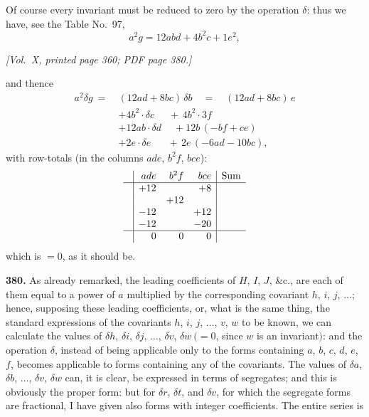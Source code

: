 \documentclass[11pt]{article}
\begin{document}
\medskip

Of course every invariant must be reduced to zero by the operation $\delta$: thus we have, see the Table No.~97,
\[
a^{2}g = 12abd + 4b^{2}c + 1e^{2},
\]

\newpage

\noindent\textit{[Vol.~X, printed page 360; PDF page 380.]}

\medskip

and thence
\begin{align*}
a^{2}\delta g\ =\ &(12ad+8bc)\,\delta b \quad =\quad (12ad+8bc)\,e \\
&+4b^{2}\cdot \delta c \quad\ \ +\,4b^{2}\cdot 3f \\
&+12ab\cdot \delta d \quad\ +12b\,(-bf+ce) \\
&+2e\cdot \delta e \quad\ \ \ +\,2e\,(-6ad-10bc),
\end{align*}
with row-totals (in the columns $ade$, $b^{2}f$, $bce$):
\[
\begin{array}{l|rrr|r}
 & ade & b^{2}f & bce & \text{Sum} \\\hline
 & +12 & & +8 & \\
 & & +12 & & \\
 & -12 & & +12 & \\
 & -12 & & -20 & \\\hline
 & 0 & 0 & 0 &
\end{array}
\]
which is $=0$, as it should be.

\medskip

\noindent\textbf{380.} As already remarked, the leading coefficients of $H$, $I$, $J$, \&c., are each of them equal to a power of $a$ multiplied by the corresponding covariant $h$, $i$, $j$, $\ldots$; hence, supposing these leading coefficients, or, what is the same thing, the standard expressions of the covariants $h$, $i$, $j$, $\ldots$, $v$, $w$ to be known, we can calculate the values of $\delta h$, $\delta i$, $\delta j$, $\ldots$, $\delta v$, $\delta w\ (=0$, since $w$ is an invariant$)$: and the operation $\delta$, instead of being applicable only to the forms containing $a$, $b$, $c$, $d$, $e$, $f$, becomes applicable to forms containing any of the covariants. The values of $\delta a$, $\delta b$, $\ldots$, $\delta v$, $\delta w$ can, it is clear, be expressed in terms of segregates; and this is obviously the proper form: but for $\delta r$, $\delta t$, and $\delta v$, for which the segregate forms are fractional, I have given also forms with integer coefficients. The entire series is

\medskip
\end{document}
